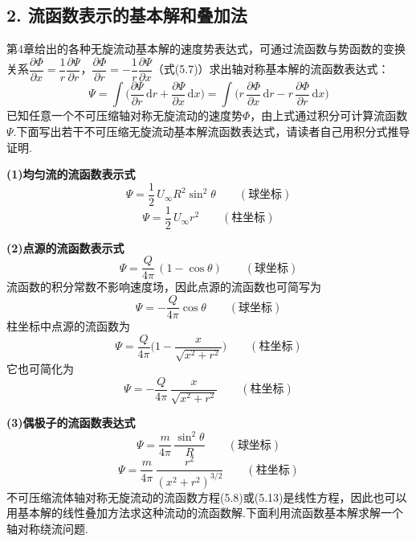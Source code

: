 \subsection*{2. 流函数表示的基本解和叠加法}

第4章给出的各种无旋流动基本解的速度势表达式，可通过流函数与势函数的变换关系$\dfrac{\partial\Phi}{\partial x}=\dfrac{1}{r}\dfrac{\partial\Psi}{\partial r}$，$\dfrac{\partial\Phi}{\partial r}=-\dfrac{1}{r}\dfrac{\partial\Psi}{\partial x}$（式(5.7)）求出轴对称基本解的流函数表达式：
\[
\Psi=\int\Big(\frac{\partial\Psi}{\partial r}\,\mathrm{d}r+\frac{\partial\Psi}{\partial x}\,\mathrm{d}x\Big)=\int\Big(r\,\frac{\partial\Phi}{\partial x}\,\mathrm{d}r-r\,\frac{\partial\Phi}{\partial r}\,\mathrm{d}x\Big)
\]
已知任意一个不可压缩轴对称无旋流动的速度势$\Phi$，由上式通过积分可计算流函数$\Psi$.下面写出若干不可压缩无旋流动基本解流函数表达式，请读者自己用积分式推导证明.

\textbf{(1)均匀流的流函数表示式}
\begin{equation*}
\Psi=\frac{1}{2}\,U_\infty R^{2}\sin^{2}\theta\qquad(\text{球坐标})
\tag{5.14a}
\end{equation*}
\begin{equation*}
\Psi=\frac{1}{2}\,U_\infty r^{2}\qquad(\text{柱坐标})
\tag{5.14b}
\end{equation*}

\textbf{(2)点源的流函数表示式}
\[
\Psi=\frac{Q}{4\pi}\,(1-\cos\theta)\qquad(\text{球坐标})
\]
流函数的积分常数不影响速度场，因此点源的流函数也可简写为
\begin{equation*}
\Psi=-\frac{Q}{4\pi}\cos\theta\qquad(\text{球坐标})
\tag{5.15a}
\end{equation*}
柱坐标中点源的流函数为
\[
\Psi=\frac{Q}{4\pi}\Big(1-\frac{x}{\sqrt{x^{2}+r^{2}}}\Big)\qquad(\text{柱坐标})
\]
它也可简化为
\begin{equation*}
\Psi=-\frac{Q}{4\pi}\,\frac{x}{\sqrt{x^{2}+r^{2}}}\qquad(\text{柱坐标})
\tag{5.15b}
\end{equation*}

\textbf{(3)偶极子的流函数表达式}
\begin{equation*}
\Psi=\frac{m}{4\pi}\,\frac{\sin^{2}\theta}{R}\qquad(\text{球坐标})
\tag{5.16a}
\end{equation*}
\begin{equation*}
\Psi=\frac{m}{4\pi}\,\frac{r^{2}}{(x^{2}+r^{2})^{3/2}}\qquad(\text{柱坐标})
\tag{5.16b}
\end{equation*}
不可压缩流体轴对称无旋流动的流函数方程(5.8)或(5.13)是线性方程，因此也可以用基本解的线性叠加方法求这种流动的流函数解.下面利用流函数基本解求解一个轴对称绕流问题.

